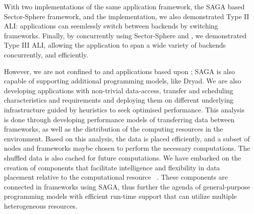 \documentclass[3p,twocolumn]{elsarticle}
\begin{document}
With two implementations of the same application framework, the SAGA
based Sector-Sphere framework, and the \smr implementation, we also
demonstrated Type II ALI: applications can seemlessly switch between
backends by switching frameworks.  Finally, by concurrently using
Sector-Sphere \mr and \smr, we demonstrated Type III ALI, allowing the
application to span a wide variety of backends concurrently, and
efficiently.

However, we are not confined to \mr and applications based upon \mr;
SAGA is also capable of supporting additional programming models, like
Dryad.  We are also developing applications with non-trivial
data-access, transfer and scheduling characteristics and requirements
and deploying them on different underlying infrastructure guided by
heuristics to seek optimised performance.
This analysis is done through developing performance models of
transferring data between frameworks, as well as the distribution of
the computing resources in the environment. Based on this analysis,
the data is placed efficiently, and a subset of nodes and frameworks
maybe chosen to perform the necessary computations. The shuffled data
is also cached for future computations.  We have embarked on the
creation of components that facilitate intelligence and flexibility in
data placement relative to the computational resource
~\cite{saga_dic_royalsoc09}. These components are connected in
frameworks using SAGA, thus further the agenda of general-purpose
programming models with efficient run-time support that can utilize
multiple heterogeneous resources.



\end{document}
